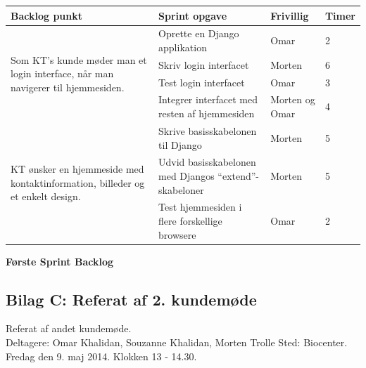 \documentclass[12pt]{article}   %
\begin{document}
\begin{center}
	\begin{tabular}{|l|p{4cm}|l|l|}
		\hline
		Backlog punkt & Sprint opgave & Frivillig & Timer\\ \hline
		\multirow{4}{4cm}{Som KT's kunde møder man et login interface,
		når man navigerer til hjemmesiden.} & Oprette en Django
		applikation & Omar  & 2 \\
		& Skriv login interfacet & Morten & 6 \\
		& Test login interfacet & Omar & 3 \\
		& Integrer interfacet med resten af hjemmesiden & Morten og Omar
		& 4 \\ \hline
		\multirow{3}{4cm}{KT ønsker en hjemmeside med
		kontaktinformation, billeder og et enkelt design.} &
		Skrive basisskabelonen til Django & Morten & 5 \\
		& Udvid basisskabelonen med Djangos ``extend''-skabeloner & Morten & 5
		\\ & Test hjemmesiden i flere forskellige browsere & Omar & 2 \\
		\hline

	\end{tabular}
\end{center}

\begin{center}
\textbf{Første Sprint Backlog}
\end{center}

\vspace{0.5cm}

\newpage

\subsection{Bilag C: Referat af 2. kundemøde}

Referat af andet kundemøde.\\

Deltagere: Omar Khalidan, Souzanne Khalidan, Morten Trolle
Sted: Biocenter. Fredag den 9. maj 2014. Klokken 13 - 14.30.\\
\end{document}
